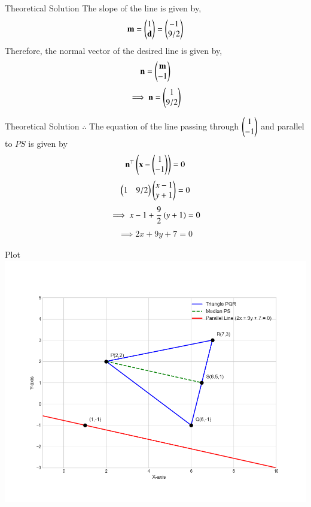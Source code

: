 \documentclass{beamer}
\begin{document}
\begin{frame}{Theoretical Solution}
The slope of the line is given by,
\begin{align}
    \mathbf{m}=\begin{pmatrix}1\\\mathbf{d}\end{pmatrix}=\begin{pmatrix}-1\\9/2\end{pmatrix}
\end{align}
Therefore, the normal vector of the desired line is given by,
\begin{align}
    \mathbf{n}=\begin{pmatrix}\mathbf{m}\\-1\end{pmatrix}
\end{align}
\begin{align}
    \implies\mathbf{n}=\begin{pmatrix}1\\9/2\end{pmatrix}
\end{align}
\end{frame}


\begin{frame}{Theoretical Solution}
$\therefore$ The equation of the line passing through $\begin{pmatrix}1\\-1\end{pmatrix}$ and parallel to $PS$ is given by
\begin{align}
    \mathbf{n}^{\top}\left(\mathbf{x}-\begin{pmatrix}1\\-1\end{pmatrix}\right)=0
\end{align}
\begin{align}
    \begin{pmatrix}1 & 9/2\end{pmatrix}\begin{pmatrix}x-1\\y+1\end{pmatrix}=0
\end{align}
\begin{align}
    \implies x-1 + \frac{9}{2}\left(y+1\right)=0
\end{align}
\begin{align}
    \implies 2x+9y+7=0
\end{align}
\end{frame}

\begin{frame}{Plot}
    \centering
    \includegraphics[width=\columnwidth, height=0.8\textheight, keepaspectratio]{figs/fig.png}
\end{frame}
\end{document}
